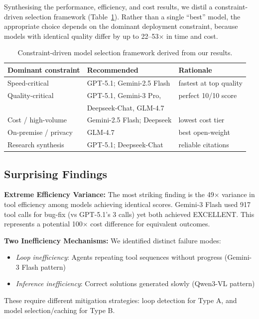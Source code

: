 Synthesising the performance, efficiency, and cost results, we distil a constraint-driven selection framework (Table~\ref{tab:selection}). Rather than a single ``best'' model, the appropriate choice depends on the dominant deployment constraint, because models with identical quality differ by up to 22--53$\times$ in time and cost.

\begin{table}[htbp]
\centering
\small
\caption{Constraint-driven model selection framework derived from our results.}
\label{tab:selection}
\begin{tabular}{@{}lll@{}}
\toprule
\textbf{Dominant constraint} & \textbf{Recommended} & \textbf{Rationale} \\
\midrule
Speed-critical & GPT-5.1; Gemini-2.5 Flash & fastest at top quality \\
Quality-critical & GPT-5.1, Gemini-3 Pro, & perfect 10/10 score \\
 & Deepseek-Chat, GLM-4.7 & \\
Cost / high-volume & Gemini-2.5 Flash; Deepseek & lowest cost tier \\
On-premise / privacy & GLM-4.7 & best open-weight \\
Research synthesis & GPT-5.1; Deepseek-Chat & reliable citations \\
\bottomrule
\end{tabular}
\end{table}

\subsection{Surprising Findings}

\textbf{Extreme Efficiency Variance:} The most striking finding is the 49$\times$ variance in tool efficiency among models achieving identical scores. Gemini-3 Flash used 917 tool calls for bug-fix (vs GPT-5.1's 3 calls) yet both achieved EXCELLENT. This represents a potential 100$\times$ cost difference for equivalent outcomes.

\textbf{Two Inefficiency Mechanisms:} We identified distinct failure modes:
\begin{itemize}
    \item \textit{Loop inefficiency}: Agents repeating tool sequences without progress (Gemini-3 Flash pattern)
    \item \textit{Inference inefficiency}: Correct solutions generated slowly (Qwen3-VL pattern)
\end{itemize}
These require different mitigation strategies: loop detection for Type A, and model selection/caching for Type B.

